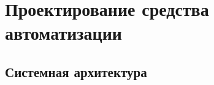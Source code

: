 \section{\large{Проектирование средства автоматизации}}

%

\subsection{\Large{Системная архитектура}}

%
%
%



%
%
%
%
%